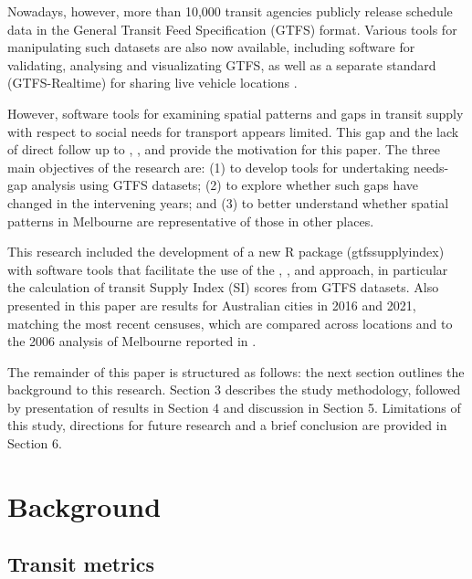 \documentclass[preprint, 3p,
authoryear]{elsarticle} %
\begin{document}
Nowadays, however, more than 10,000 transit agencies publicly release
schedule data in the General Transit Feed Specification (GTFS) format.
Various tools for manipulating such datasets are also now available,
including software for validating, analysing and visualizating GTFS, as
well as a separate standard (GTFS-Realtime) for sharing live vehicle
locations \citep{GTFS}.

However, software tools for examining spatial patterns and gaps in
transit supply with respect to social needs for transport appears
limited. This gap and the lack of direct follow up to
\citet{Currie2003Hobart}, \citet{Currie2004Gap},
\citet{Currie2007Identifying} and \citet{currie2010identifying} provide
the motivation for this paper. The three main objectives of the research
are: (1) to develop tools for undertaking needs-gap analysis using GTFS
datasets; (2) to explore whether such gaps have changed in the
intervening years; and (3) to better understand whether spatial patterns
in Melbourne are representative of those in other places.

This research included the development of a new R package
(gtfssupplyindex) with software tools that facilitate the use of the
\citet{Currie2003Hobart}, \citet{Currie2004Gap},
\citet{Currie2007Identifying} and \citet{currie2010identifying}
approach, in particular the calculation of transit Supply Index (SI)
scores from GTFS datasets. Also presented in this paper are results for
Australian cities in 2016 and 2021, matching the most recent censuses,
which are compared across locations and to the 2006 analysis of
Melbourne reported in \citet{currie2010identifying}.

The remainder of this paper is structured as follows: the next section
outlines the background to this research. Section 3 describes the study
methodology, followed by presentation of results in Section 4 and
discussion in Section 5. Limitations of this study, directions for
future research and a brief conclusion are provided in Section 6.

\section{Background}\label{background}

\subsection{Transit metrics}\label{transit-metrics}
\end{document}
